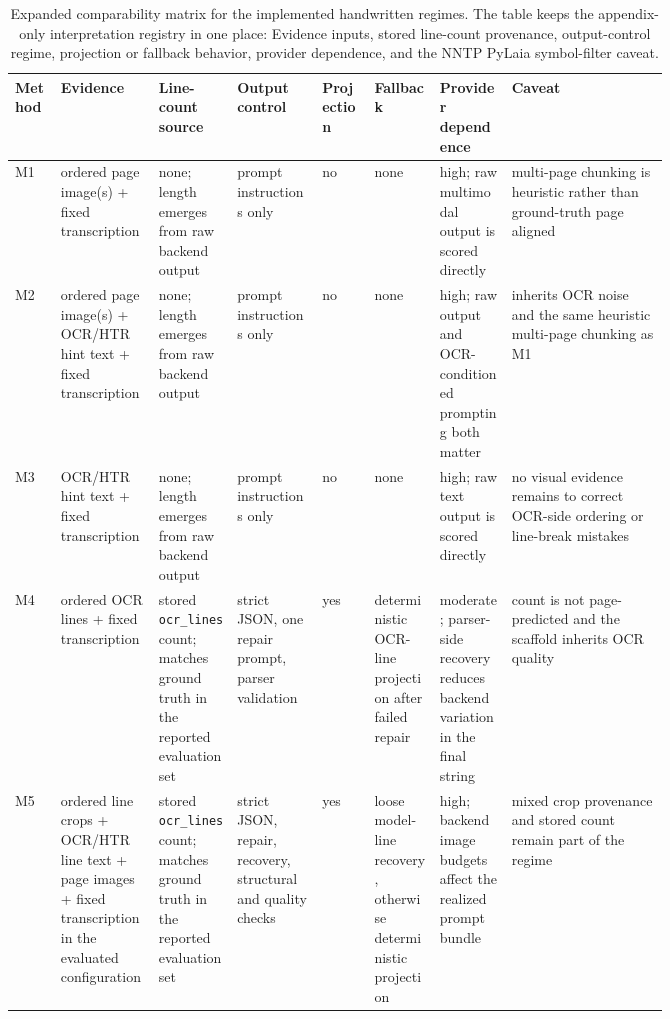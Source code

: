 \begin{table}[p]
  \centering
  \caption{Expanded comparability matrix for the implemented handwritten regimes. The table keeps the appendix-only interpretation registry in one place: Evidence inputs, stored line-count provenance, output-control regime, projection or fallback behavior, provider dependence, and the NNTP PyLaia symbol-filter caveat.}
  \label{tab:app_method_comparability_matrix_full}
  \scriptsize
  \renewcommand{\arraystretch}{1.08}
  \setlength{\tabcolsep}{3pt}
  \begin{tabularx}{\linewidth}{@{}>{\raggedright\arraybackslash}p{0.07\linewidth}>{\raggedright\arraybackslash}p{0.15\linewidth}>{\raggedright\arraybackslash}p{0.12\linewidth}>{\raggedright\arraybackslash}p{0.13\linewidth}>{\raggedright\arraybackslash}p{0.08\linewidth}>{\raggedright\arraybackslash}p{0.10\linewidth}>{\raggedright\arraybackslash}p{0.11\linewidth}Y@{}}
    \toprule
    \textbf{Method} & \textbf{Evidence} & \textbf{Line-count source} & \textbf{Output control} & \textbf{Projection} & \textbf{Fallback} & \textbf{Provider dependence} & \textbf{Caveat} \\
    \midrule
    M1 & ordered page image(s) + fixed transcription & none; length emerges from raw backend output & prompt instructions only & no & none & high; raw multimodal output is scored directly & multi-page chunking is heuristic rather than ground-truth page aligned \\
    M2 & ordered page image(s) + OCR/HTR hint text + fixed transcription & none; length emerges from raw backend output & prompt instructions only & no & none & high; raw output and OCR-conditioned prompting both matter & inherits OCR noise and the same heuristic multi-page chunking as M1 \\
    M3 & OCR/HTR hint text + fixed transcription & none; length emerges from raw backend output & prompt instructions only & no & none & high; raw text output is scored directly & no visual evidence remains to correct OCR-side ordering or line-break mistakes \\
    M4 & ordered OCR lines + fixed transcription & stored \texttt{ocr\_lines} count; matches ground truth in the reported evaluation set & strict JSON, one repair prompt, parser validation & yes & deterministic OCR-line projection after failed repair & moderate; parser-side recovery reduces backend variation in the final string & count is not page-predicted and the scaffold inherits OCR quality \\
    M5 & ordered line crops + OCR/HTR line text + page images + fixed transcription in the evaluated configuration & stored \texttt{ocr\_lines} count; matches ground truth in the reported evaluation set & strict JSON, repair, recovery, structural and quality checks & yes & loose model-line recovery, otherwise deterministic projection & high; backend image budgets affect the realized prompt bundle & mixed crop provenance and stored count remain part of the regime \\

\end{tabularx}
\end{table}
